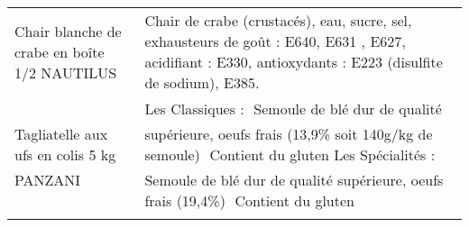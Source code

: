 \begin{longtable}{p{5cm}p{10cm}}
                                                             Chair blanche de crabe en boîte 1/2 NAUTILUS &                                                                                                                                                                                                                                                                                                                                                                                                                                                                                                                                                                                                                                                                                                                                                                                                                                                                                Chair de crabe (crustacés), eau, sucre, sel, exhausteurs de goût : E640, E631 , E627, acidifiant : E330, antioxydants : E223 (disulfite de sodium), E385. \\
                                                               Tagliatelle aux ufs en colis 5 kg PANZANI &                                                                                                                                                                                                                                                                                                                                                                                                                                                                                                                                                                                                                                                                                                                                                                                                Les Classiques :   Semoule de blé dur de qualité supérieure, oeufs frais (13,9\% soit 140g/kg de semoule)   Contient du gluten  Les Spécialités :   Semoule de blé dur de qualité supérieure, oeufs frais (19,4\%)   Contient du gluten \\

\end{longtable}
